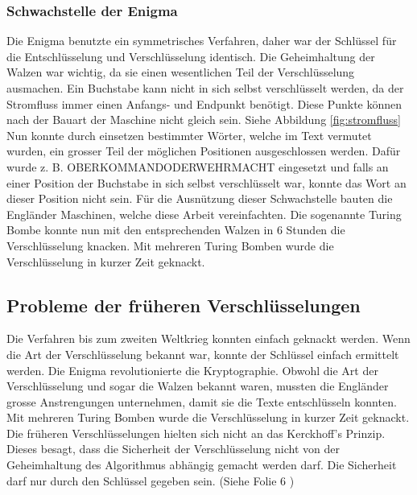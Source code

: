 \subsubsection{Schwachstelle der Enigma}
Die Enigma benutzte ein symmetrisches Verfahren, daher war der Schlüssel für die Entschlüsselung und Verschlüsselung identisch. %
Die Geheimhaltung der Walzen war wichtig, da sie einen wesentlichen Teil der Verschlüsselung ausmachen.
Ein Buchstabe kann nicht in sich selbst verschlüsselt werden, da der Stromfluss immer einen Anfangs- und Endpunkt benötigt. Diese Punkte können nach der Bauart der Maschine nicht gleich sein. Siehe Abbildung \ref{fig:stromfluss}
Nun konnte durch einsetzen bestimmter Wörter, welche im Text vermutet wurden, ein grosser Teil der möglichen Positionen ausgeschlossen werden. Dafür wurde z. B. OBERKOMMANDODERWEHRMACHT eingesetzt und falls an einer Position der Buchstabe in sich selbst verschlüsselt war, konnte das Wort an dieser Position nicht sein. Für die Ausnützung dieser Schwachstelle bauten die Engländer Maschinen, welche diese Arbeit vereinfachten. Die sogenannte Turing Bombe konnte nun mit den entsprechenden Walzen in 6 Stunden die Verschlüsselung knacken. 
Mit mehreren Turing Bomben wurde die Verschlüsselung in kurzer Zeit geknackt. 
%
\subsection{Probleme der früheren Verschlüsselungen}
\label{sec:Probleme_der_frueheren_Verschluesselungen}
Die Verfahren bis zum zweiten Weltkrieg konnten einfach geknackt werden. Wenn die Art der Verschlüsselung bekannt war, konnte der Schlüssel einfach ermittelt werden. 
Die Enigma revolutionierte die Kryptographie. Obwohl die Art der Verschlüsselung und sogar die Walzen bekannt waren, mussten die Engländer grosse Anstrengungen unternehmen, damit sie die Texte entschlüsseln konnten. \\[2ex]
Mit mehreren Turing Bomben wurde die Verschlüsselung in kurzer Zeit geknackt. \\[2ex]
%
Die früheren Verschlüsselungen hielten sich nicht an das Kerckhoff's Prinzip. Dieses besagt, dass die Sicherheit der Verschlüsselung nicht von der Geheimhaltung des Algorithmus abhängig gemacht werden darf. Die Sicherheit darf nur durch den Schlüssel gegeben sein. (Siehe Folie 6 \cite{kerckhoffsprinzip} )
%